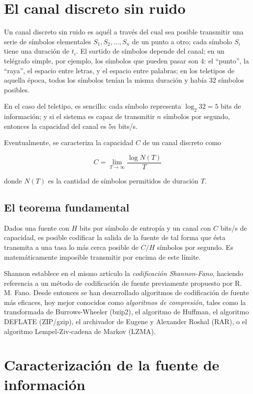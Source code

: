 \documentclass[spanish]{article}
\begin{document}
\section{El canal discreto sin ruido}

Un canal discreto sin ruido es aquél a través del cual sea posible transmitir una serie de símbolos elementales $S_1, S_2, ..., S_n$ de un punto a otro; cada símbolo $S_i$ tiene una duración de $t_i$. El surtido de símbolos depende del canal; en un telégrafo simple, por ejemplo, los símbolos que pueden pasar son 4: el ``punto'', la ``raya'', el espacio entre letras, y el espacio entre palabras; en los teletipos de aquella época, todos los símbolos tenían la misma duración y había 32 símbolos posibles.

En el caso del teletipo, es sencillo: cada símbolo representa $\log_2 32 = 5$ bits de información; y si el sistema es capaz de transmitir $n$ símbolos por segundo, entonces la capacidad del canal es $5n$ bits/s.

Eventualmente, se caracteriza la capacidad $C$ de un canal discreto como 

\[
   C = \lim_{T \to \infty} \frac{\log N(T)}{T}
\]

donde $N(T)$ es la cantidad de símbolos permitidos de duración $T$.


\subsection{El teorema fundamental}

Dados una fuente con $H$ bits por símbolo de entropía y un canal con $C$ bits/s de capacidad, es posible codificar la salida de la fuente de tal forma que ésta transmita a una tasa lo más cerca posible de $C/H$ símbolos por segundo. Es matemáticamente imposible transmitir por encima de este límite.

Shannon establece en el mismo artículo la \textit{codificación Shannon-Fano}, haciendo referencia a un método de codificación de fuente previamente propuesto por R. M. Fano. Desde entonces se han desarrollado algoritmos de codificación de fuente más eficaces, hoy mejor conocidos como \textit{algoritmos de compresión}, tales como la transformada de Burrows-Wheeler (bzip2), el algoritmo de Huffman, el algoritmo DEFLATE (ZIP/gzip), el archivador de Eugene y Alexander Roshal (RAR), o el algoritmo Lempel-Ziv-cadena de Markov (LZMA).


\section{Caracterización de la fuente de información}
\end{document}
